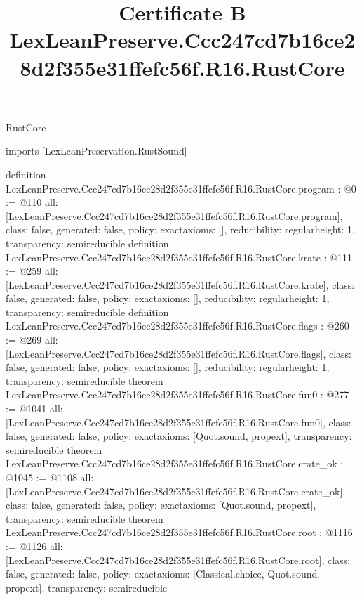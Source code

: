 \begin{lexlean}{RustCore}
\title{Certificate B LexLeanPreserve.Ccc247cd7b16ce28d2f355e31ffefc56f.R16.RustCore}
\begin{coremodule}
imports [LexLeanPreservation.RustSound]

definition LexLeanPreserve.Ccc247cd7b16ce28d2f355e31ffefc56f.R16.RustCore.program : @0 := @110 {
  all: [LexLeanPreserve.Ccc247cd7b16ce28d2f355e31ffefc56f.R16.RustCore.program],
  class: false,
  generated: false,
  policy: exact{axioms: []},
  reducibility: regular{height: 1},
  transparency: semireducible
}
definition LexLeanPreserve.Ccc247cd7b16ce28d2f355e31ffefc56f.R16.RustCore.krate : @111 := @259 {
  all: [LexLeanPreserve.Ccc247cd7b16ce28d2f355e31ffefc56f.R16.RustCore.krate],
  class: false,
  generated: false,
  policy: exact{axioms: []},
  reducibility: regular{height: 1},
  transparency: semireducible
}
definition LexLeanPreserve.Ccc247cd7b16ce28d2f355e31ffefc56f.R16.RustCore.flags : @260 := @269 {
  all: [LexLeanPreserve.Ccc247cd7b16ce28d2f355e31ffefc56f.R16.RustCore.flags],
  class: false,
  generated: false,
  policy: exact{axioms: []},
  reducibility: regular{height: 1},
  transparency: semireducible
}
theorem LexLeanPreserve.Ccc247cd7b16ce28d2f355e31ffefc56f.R16.RustCore.fun0 : @277 := @1041 {
  all: [LexLeanPreserve.Ccc247cd7b16ce28d2f355e31ffefc56f.R16.RustCore.fun0],
  class: false,
  generated: false,
  policy: exact{axioms: [Quot.sound, propext]},
  transparency: semireducible
}
theorem LexLeanPreserve.Ccc247cd7b16ce28d2f355e31ffefc56f.R16.RustCore.crate_ok : @1045 := @1108 {
  all: [LexLeanPreserve.Ccc247cd7b16ce28d2f355e31ffefc56f.R16.RustCore.crate_ok],
  class: false,
  generated: false,
  policy: exact{axioms: [Quot.sound, propext]},
  transparency: semireducible
}
theorem LexLeanPreserve.Ccc247cd7b16ce28d2f355e31ffefc56f.R16.RustCore.root : @1116 := @1126 {
  all: [LexLeanPreserve.Ccc247cd7b16ce28d2f355e31ffefc56f.R16.RustCore.root],
  class: false,
  generated: false,
  policy: exact{axioms: [Classical.choice, Quot.sound, propext]},
  transparency: semireducible
}


\end{coremodule}
\end{lexlean}
